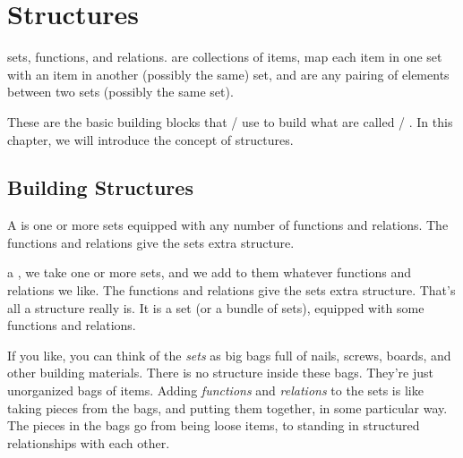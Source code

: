 \documentclass[../../../main.tex]{subfiles}
\begin{document}
\chapter{Structures}
\label{ch:structures}

 sets, functions, and relations.  are collections of items,  map each item in one set with an item in another (possibly the same) set, and  are any pairing of elements between two sets (possibly the same set). 

These are the basic building blocks that \mathers/ use to build what are called \mathical/ . In this chapter, we will introduce the concept of structures.


\section{Building Structures}

\begin{terminology}
  A  is one or more sets equipped with any number of functions and relations. The functions and relations give the sets extra structure.
\end{terminology}

 a , we take one or more sets, and we add to them whatever functions and relations we like. The functions and relations give the sets extra structure. That's all a structure really is. It is a set (or a bundle of sets), equipped with some functions and relations.

\begin{aside}
  \begin{remark}
    If you like, you can think of the \emph{sets} as big bags full of nails, screws, boards, and other building materials. There is no structure inside these bags. They're just unorganized bags of items. Adding \emph{functions} and \emph{relations} to the sets is like taking pieces from the bags, and putting them together, in some particular way. The pieces in the bags go from being loose items, to standing in structured relationships with each other.
  \end{remark}
\end{aside}
\end{document}

